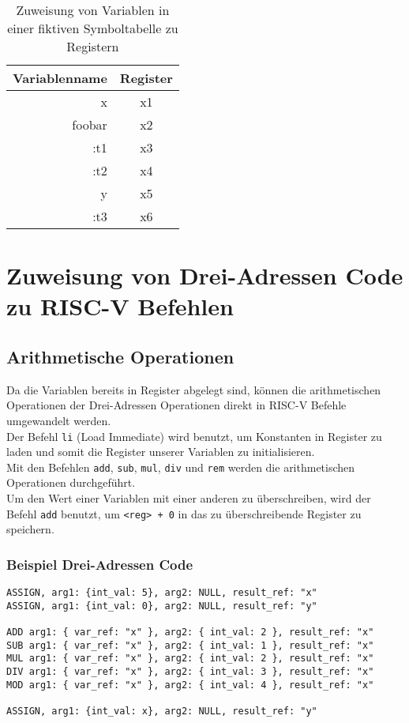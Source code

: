 \begin{table}[H]
	\begin{center}
		\begin{tabular}{| r | c |}
			\hline
			Variablenname & Register \\
			\hline
			x & x1 \\
			foobar & x2 \\
			:t1 & x3 \\
			:t2 & x4 \\
			y & x5 \\
			:t3 & x6 \\
			\hline
		\end{tabular}
	\end{center}
	\caption{Zuweisung von Variablen in einer fiktiven Symboltabelle zu Registern}
\end{table}

\section{Zuweisung von Drei-Adressen Code zu RISC-V Befehlen}

\subsection{Arithmetische Operationen}

Da die Variablen bereits in Register abgelegt sind, können die arithmetischen Operationen der Drei-Adressen Operationen direkt in RISC-V Befehle umgewandelt werden.\\
Der Befehl \texttt{li} (Load Immediate) wird benutzt, um Konstanten in Register zu laden und somit die Register unserer Variablen zu initialisieren.\\
Mit den Befehlen \texttt{add}, \texttt{sub}, \texttt{mul}, \texttt{div} und \texttt{rem} werden die arithmetischen Operationen durchgeführt.\\
Um den Wert einer Variablen mit einer anderen zu überschreiben, wird der Befehl \texttt{add} benutzt, um \texttt{<reg> + 0} in das zu überschreibende Register zu speichern.\\

\subsubsection{Beispiel Drei-Adressen Code}

\begin{lstlisting}
ASSIGN, arg1: {int_val: 5}, arg2: NULL, result_ref: "x"
ASSIGN, arg1: {int_val: 0}, arg2: NULL, result_ref: "y"

ADD arg1: { var_ref: "x" }, arg2: { int_val: 2 }, result_ref: "x"
SUB arg1: { var_ref: "x" }, arg2: { int_val: 1 }, result_ref: "x"
MUL arg1: { var_ref: "x" }, arg2: { int_val: 2 }, result_ref: "x"
DIV arg1: { var_ref: "x" }, arg2: { int_val: 3 }, result_ref: "x"
MOD arg1: { var_ref: "x" }, arg2: { int_val: 4 }, result_ref: "x"

ASSIGN, arg1: {int_val: x}, arg2: NULL, result_ref: "y"
\end{lstlisting}

